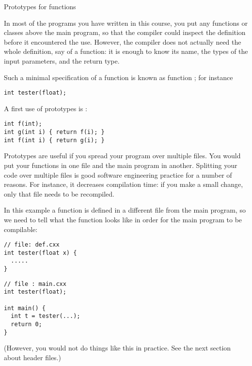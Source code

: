 
 {Prototypes for functions}
\label{sec:proto}

In most of the programs you have written in this course, you put any
functions or classes above the main program, so that the compiler
could inspect the definition before it encountered the use. However,
the compiler does not actually need the whole definition, say of a
function: it is enough to know its name, the types of the input
parameters, and the return type.

Such a minimal specification of a function is known as function
; for instance
\begin{verbatim}
int tester(float);
\end{verbatim}

A first use of prototypes is :
\begin{verbatim}
int f(int);
int g(int i) { return f(i); }
int f(int i) { return g(i); }
\end{verbatim}

Prototypes are useful if you spread your program over multiple
files. You would put your functions in one file
and the main program in another. Splitting your code over multiple
files is good software engineering practice for a number of
reasons. For instance, it decreases compilation
time: if you make a small change, only that file needs to be recompiled.

In this example a function 
is defined in a different file from the main program, so we need to
tell  what the function looks like in order for the main
program to be compilable:
\begin{multicols}{2}  
\begin{verbatim}
// file: def.cxx
int tester(float x) {
  .....
}
\end{verbatim}
\vfill\columnbreak
\begin{verbatim}
// file : main.cxx
int tester(float);

int main() {
  int t = tester(...);
  return 0;
}
\end{verbatim}
\end{multicols}
(However, you would not do things like this in practice. See the next
section about header files.)

